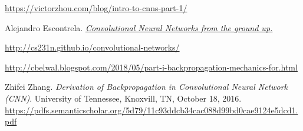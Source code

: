 \documentclass[a4paper,12pt]{article}
\begin{document}
\newpage
\begin{thebibliography}{9}
\url{https://victorzhou.com/blog/intro-to-cnns-part-1/}

Alejandro Escontrela. \textit{\href{https://towardsdatascience.com/convolutional-neural-networks-from-the-ground-up-c67bb41454e1}{Convolutional Neural Networks from the ground up.}}

\url{http://cs231n.github.io/convolutional-networks/}

\url{http://cbelwal.blogspot.com/2018/05/part-i-backpropagation-mechanics-for.html}

Zhifei Zhang. \textit{Derivation of Backpropagation in
Convolutional Neural Network (CNN)}. University of Tennessee, Knoxvill, TN, October 18, 2016.\\
\url{https://pdfs.semanticscholar.org/5d79/11c93ddcb34cac088d99bd0cae9124e5dcd1.pdf}
\end{thebibliography}
\end{document}
